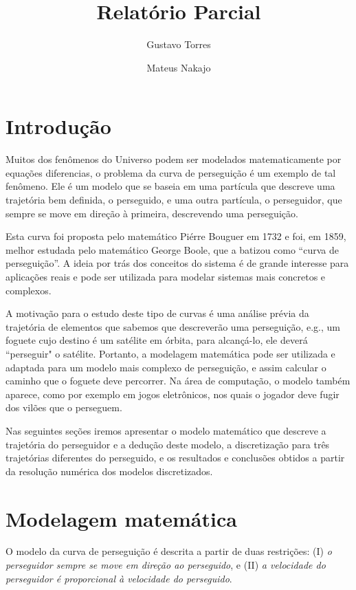 \documentclass[a4paper,10pt]{article}
\title{Relatório Parcial}
\author{Gustavo Torres \and Mateus Nakajo}
\begin{document}
\lstset{language=Python}

\maketitle

\section{Introdução}
  Muitos dos fenômenos do Universo podem ser modelados matematicamente por equações diferencias, o problema da curva de perseguição é um exemplo de tal fenômeno. Ele é um modelo que se baseia em uma partícula que descreve uma trajetória bem definida, o perseguido, e uma outra partícula, o perseguidor, que sempre se move em direção à primeira, descrevendo uma perseguição.
  
  Esta curva foi proposta pelo matemático Piérre Bouguer em 1732 e foi, em 1859, melhor estudada pelo matemático George Boole, que a batizou como “curva de perseguição”. 
  A ideia por trás dos conceitos do sistema é de grande interesse para  aplicações reais e pode ser utilizada para modelar sistemas mais concretos e complexos.
  
  A motivação para o estudo deste tipo de curvas é uma análise prévia da trajetória de elementos que sabemos que descreverão uma perseguição, e.g., um foguete cujo destino é um satélite em órbita, para alcançá-lo, ele deverá ``perseguir" o satélite. Portanto, a modelagem matemática pode ser utilizada e adaptada para um modelo mais complexo de perseguição, e assim calcular o caminho que o foguete deve percorrer. Na área de computação, o modelo também aparece, como por exemplo em jogos eletrônicos, nos quais o jogador deve fugir dos vilões que o perseguem. 
  
  Nas seguintes seções iremos apresentar o modelo matemático que descreve a trajetória do perseguidor e a dedução deste modelo, a discretização para três trajetórias diferentes do perseguido, e os resultados e conclusões obtidos a partir da resolução numérica dos modelos discretizados.
  
\section{Modelagem matemática}
  O modelo da curva de perseguição é descrita a partir de duas restrições\cite{lloyd}: (I) \emph{o perseguidor sempre se move em direção ao perseguido}, e (II) \emph{a velocidade do perseguidor é proporcional à velocidade do perseguido}.
  
\end{document}
